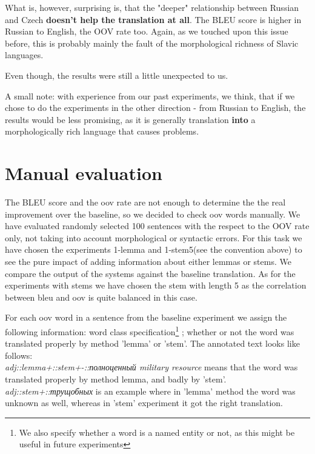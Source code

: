 \documentclass[11pt,letterpaper]{article}
\begin{document}
What is, however, surprising is, that the "deeper" relationship between Russian and Czech \textbf{doesn't help the translation at all}. The BLEU score is higher in Russian to English, the OOV rate too. Again, as we touched upon this issue before, this is probably mainly the fault of the morphological richness of Slavic languages. 

Even though, the results were still a little unexpected to us. 

A small note: with experience from our past experiments, we think, that if we chose to do the experiments in the other direction - from Russian to English, the results would be less promising, as it is generally translation \textbf{into} 
a morphologically rich language that causes problems.

\section{Manual evaluation} 
The BLEU score and the oov rate are not enough to determine the
the real improvement over the baseline, so we decided to check oov words manually.
We have evaluated randomly selected 100 sentences with the respect to the OOV rate only,
not taking into account morphological or syntactic errors.%
For this task we have chosen the experiments 1-lemma and 1-stem5(see the convention above)
to see the pure impact of adding information about either lemmas or stems.
We compare the output of the systems against the baseline translation.
As for the experiments with stems we have chosen the stem with length 5 as
the correlation between bleu and oov is quite balanced in this case.

For each oov word in a sentence from the baseline experiment we assign the
following information: word class specification\footnote{We also specify whether a word is a named entity or not, as this might be useful in future experiments}
; whether or not the word was
translated properly by method 'lemma' or 'stem'. The annotated
text looks like follows:\\
\textit{adj::lemma+::stem+-::полноценный military resource} means that %
the word was translated properly by method lemma, and badly by 'stem'.
\textit{adj::stem+::трущобных} is an example where in 'lemma' method
the word was unknown as well, whereas in 'stem' experiment
it got the right translation.
\end{document}
